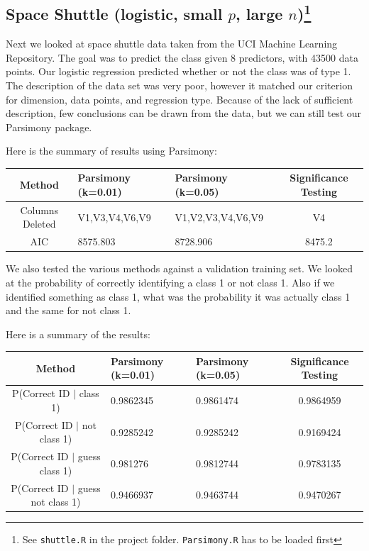 \documentclass[letter]{article}
\newcounter{foot}
\begin{document}
\subsection*{Space Shuttle \cite{shuttle} (logistic, small $p$, large $n$)\footnote{See \texttt{shuttle.R} in the project folder. \texttt{Parsimony.R} has to be loaded first}}
Next we looked at space shuttle data taken from the UCI Machine Learning Repository. The goal was to predict the class given 8 predictors, with 43500 data points. Our logistic regression predicted whether or not the class was of type 1.  The description of the data set was very poor, however it matched our criterion for dimension, data points, and regression type. Because of the lack of sufficient description, few conclusions can be drawn from the data, but we can still test our Parsimony package.

Here is the summary of results using Parsimony:

\begin{tabular}{ | c | p{3cm} | p{3.3cm} | c  |}
\hline
Method&Parsimony (k=0.01) & Parsimony (k=0.05) & Significance Testing \\
\hline
Columns Deleted& V1,V3,V4,V6,V9 & V1,V2,V3,V4,V6,V9 & V4 \\
\hline
AIC & 8575.803 & 8728.906 & 8475.2 \\
\hline
\end{tabular}

We also tested the various methods against a validation training set. We looked at the probability of correctly identifying a class 1 or not class 1. Also if we identified something as class 1, what was the probability it was actually class 1 and the same for not class 1.

Here is a summary of the results:

\begin{tabular}{ | c | p{3cm} | p{3.3cm} | c  |}
\hline
Method&Parsimony (k=0.01) & Parsimony (k=0.05) & Significance Testing \\
\hline
P(Correct ID $|$ class 1) & 0.9862345 & 0.9861474 & 0.9864959 \\
\hline
P(Correct ID $|$ not class 1) & 0.9285242 & 0.9285242 & 0.9169424 \\
\hline
P(Correct ID $|$ guess class 1) & 0.981276 & 0.9812744 & 0.9783135 \\
\hline
P(Correct ID $|$ guess not class 1) & 0.9466937 & 0.9463744 & 0.9470267  \\
\hline
\end{tabular}
\end{document}
